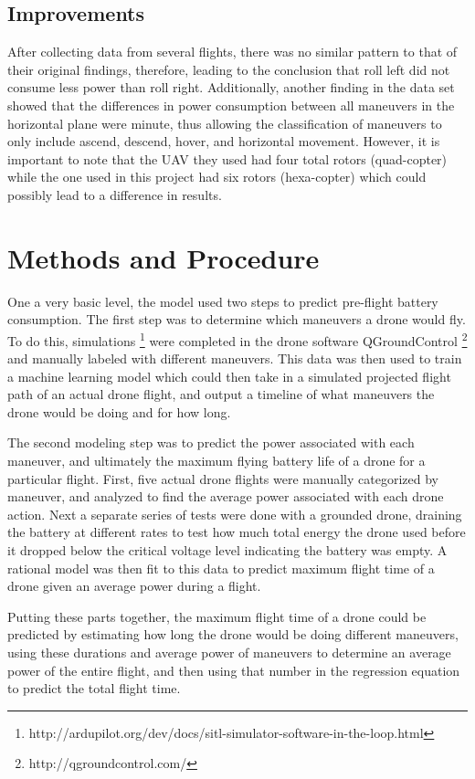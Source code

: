 \documentclass{article}
\begin{document}
\subsection{Improvements}
After collecting data from several flights, there was no similar pattern to that of their original findings, therefore, leading to the conclusion that roll left did not consume less power than roll right. Additionally, another finding in the data set showed that the differences in power consumption between all maneuvers in the horizontal plane were minute, thus allowing the classification of maneuvers to only include ascend, descend, hover, and horizontal movement. However, it is important to note that the UAV they used had four total rotors (quad-copter) while the one used in this project had six rotors (hexa-copter) which could possibly lead to a difference in results.


\section{Methods and Procedure}
One a very basic level, the model used two steps to predict pre-flight battery consumption. The first step was to determine which maneuvers a drone would fly. To do this, simulations \footnote{http://ardupilot.org/dev/docs/sitl-simulator-software-in-the-loop.html} were completed in the drone software QGroundControl \footnote{http://qgroundcontrol.com/} and manually labeled with different maneuvers. This data was then used to train a machine learning model which could then take in a simulated projected flight path of an actual drone flight, and output a timeline of what maneuvers the drone would be doing and for how long.\par

The second modeling step was to predict the power associated with each maneuver, and ultimately the maximum flying battery life of a drone for a particular flight. First, five actual drone flights were manually categorized by maneuver, and analyzed to find the average power associated with each drone action. Next a separate series of tests were done with a grounded drone, draining the battery at different rates to test how much total energy the drone used before it dropped below the critical voltage level indicating the battery was empty. A rational model was then fit to this data to predict maximum flight time of a drone given an average power during a flight.\par

Putting these parts together, the maximum flight time of a drone could be predicted by estimating how long the drone would be doing different maneuvers, using these durations and average power of maneuvers to determine an average power of the entire flight, and then using that number in the regression equation to predict the total flight time.
\end{document}
